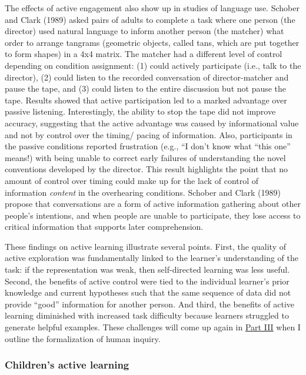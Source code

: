 \documentclass[english,floatsintext,man]{apa6}
\theoremstyle{definition}
\theoremstyle{definition}
\theoremstyle{definition}
\theoremstyle{remark}
\begin{document}
The effects of active engagement also show up in studies of language
use. Schober and Clark (1989) asked pairs of adults to complete a task
where one person (the director) used natural language to inform another
person (the matcher) what order to arrange tangrams (geometric objects,
called tans, which are put together to form shapes) in a 4x4 matrix. The
matcher had a different level of control depending on condition
assignment: (1) could actively participate (i.e., talk to the director),
(2) could listen to the recorded conversation of director-matcher and
pause the tape, and (3) could listen to the entire discussion but not
pause the tape. Results showed that active participation led to a marked
advantage over passive listening. Interestingly, the ability to stop the
tape did not improve accuracy, suggesting that the active advantage was
caused by informational value and not by control over the timing/ pacing
of information. Also, participants in the passive conditions reported
frustration (e.g., ``I don't know what \enquote{this one} means!) with
being unable to correct early failures of understanding the novel
conventions developed by the director. This result highlights the point
that no amount of control over timing could make up for the lack of
control of information \emph{content} in the overhearing conditions.
Schober and Clark (1989) propose that conversations are a form of active
information gathering about other people's intentions, and when people
are unable to participate, they lose access to critical information that
supports later comprehension.

These findings on active learning illustrate several points. First, the
quality of active exploration was fundamentally linked to the learner's
understanding of the task: if the representation was weak, then
self-directed learning was less useful. Second, the benefits of active
control were tied to the individual learner's prior knowledge and
current hypotheses such that the same sequence of data did not provide
\enquote{good} information for another person. And third, the benefits
of active learning diminished with increased task difficulty because
learners struggled to generate helpful examples. These challenges will
come up again in \protect\hyperlink{p3}{Part III} when I outline the
formalization of human inquiry.

\subsubsection{Children's active
learning}\label{childrens-active-learning}
\end{document}
